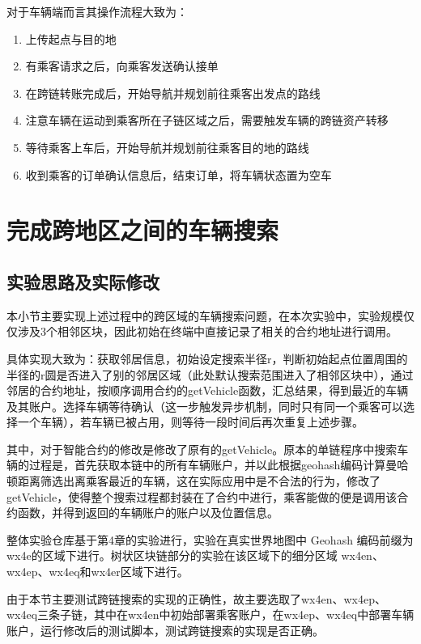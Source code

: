 对于车辆端而言其操作流程大致为：

\begin{enumerate}
    \item 上传起点与目的地
    \item 有乘客请求之后，向乘客发送确认接单
    \item 在跨链转账完成后，开始导航并规划前往乘客出发点的路线
    \item 注意车辆在运动到乘客所在子链区域之后，需要触发车辆的跨链资产转移
    \item 等待乘客上车后，开始导航并规划前往乘客目的地的路线
    \item 收到乘客的订单确认信息后，结束订单，将车辆状态置为空车
\end{enumerate}


\section{完成跨地区之间的车辆搜索}

\subsection{实验思路及实际修改}

本小节主要实现上述过程中的跨区域的车辆搜索问题，在本次实验中，实验规模仅仅涉及3个相邻区块，因此初始在终端中直接记录了相关的合约地址进行调用。

具体实现大致为：获取邻居信息，初始设定搜索半径r，判断初始起点位置周围的半径的r圆是否进入了别的邻居区域（此处默认搜索范围进入了相邻区块中），通过邻居的合约地址，按顺序调用合约的getVehicle函数，汇总结果，得到最近的车辆及其账户。选择车辆等待确认（这一步触发异步机制，同时只有同一个乘客可以选择一个车辆），若车辆已被占用，则等待一段时间后再次重复上述步骤。

其中，对于智能合约的修改是修改了原有的getVehicle。原本的单链程序中搜索车辆的过程是，首先获取本链中的所有车辆账户，并以此根据geohash编码计算曼哈顿距离筛选出离乘客最近的车辆，这在实际应用中是不合法的行为，修改了getVehicle，使得整个搜索过程都封装在了合约中进行，乘客能做的便是调用该合约函数，并得到返回的车辆账户的账户以及位置信息。

整体实验仓库基于第4章的实验进行，实验在真实世界地图中 Geohash 编码前缀为wx4e的区域下进行。树状区块链部分的实验在该区域下的细分区域 wx4en、wx4ep、wx4eq和wx4er区域下进行。

由于本节主要测试跨链搜索的实现的正确性，故主要选取了wx4en、wx4ep、wx4eq三条子链，其中在wx4en中初始部署乘客账户，在wx4ep、wx4eq中部署车辆账户，运行修改后的测试脚本，测试跨链搜索的实现是否正确。

